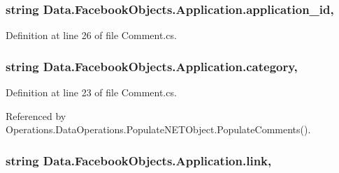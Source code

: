 \subsubsection[{\texorpdfstring{application\+\_\+id}{application_id}}]{\setlength{\rightskip}{0pt plus 5cm}string Data.\+Facebook\+Objects.\+Application.\+application\+\_\+id\hspace{0.3cm}{\ttfamily [get]}, {\ttfamily [set]}}\hypertarget{class_data_1_1_facebook_objects_1_1_application_a4033dd840557cd10d936869a4b9dab85}{}\label{class_data_1_1_facebook_objects_1_1_application_a4033dd840557cd10d936869a4b9dab85}


Definition at line 26 of file Comment.\+cs.

\subsubsection[{\texorpdfstring{category}{category}}]{\setlength{\rightskip}{0pt plus 5cm}string Data.\+Facebook\+Objects.\+Application.\+category\hspace{0.3cm}{\ttfamily [get]}, {\ttfamily [set]}}\hypertarget{class_data_1_1_facebook_objects_1_1_application_aa672437a8fd9f3398baf2cd7491a929a}{}\label{class_data_1_1_facebook_objects_1_1_application_aa672437a8fd9f3398baf2cd7491a929a}


Definition at line 23 of file Comment.\+cs.



Referenced by Operations.\+Data\+Operations.\+Populate\+N\+E\+T\+Object.\+Populate\+Comments().

\subsubsection[{\texorpdfstring{link}{link}}]{\setlength{\rightskip}{0pt plus 5cm}string Data.\+Facebook\+Objects.\+Application.\+link\hspace{0.3cm}{\ttfamily [get]}, {\ttfamily [set]}}\hypertarget{class_data_1_1_facebook_objects_1_1_application_ae209b254e59693c4f2ad2c774d908426}{}\label{class_data_1_1_facebook_objects_1_1_application_ae209b254e59693c4f2ad2c774d908426}


